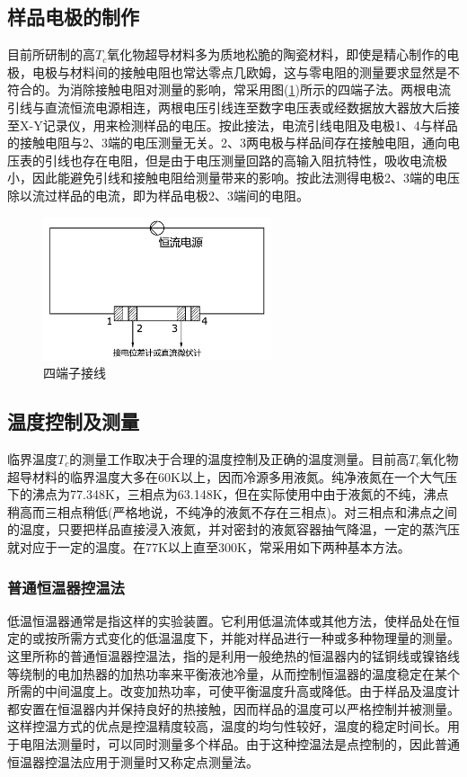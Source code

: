 \documentclass[a4paper]{article}
\begin{document}
\subsection{样品电极的制作}
目前所研制的高$T_c$氧化物超导材料多为质地松脆的陶瓷材料，即使是精心制作的电极，电极与材料间的接触电阻也常达零点几欧姆，这与零电阻的测量要求显然是不符合的。为消除接触电阻对测量的影响，常采用图(\ref{fig2})所示的四端子法。两根电流引线与直流恒流电源相连，两根电压引线连至数字电压表或经数据放大器放大后接至X-Y记录仪，用来检测样品的电压。按此接法，电流引线电阻及电极1、4与样品的接触电阻与2、3端的电压测量无关。2、3两电极与样品间存在接触电阻，通向电压表的引线也存在电阻，但是由于电压测量回路的高输入阻抗特性，吸收电流极小，因此能避免引线和接触电阻给测量带来的影响。按此法测得电极2、3端的电压除以流过样品的电流，即为样品电极2、3端间的电阻。
\begin{figure}[!h]
\centering
\includegraphics[width=0.6\textwidth]{fig/fig2.pdf}
\caption{四端子接线}\label{fig2}
\end{figure}

\subsection{温度控制及测量}
临界温度$T_c$的测量工作取决于合理的温度控制及正确的温度测量。目前高$T_c$氧化物超导材料的临界温度大多在60K以上，因而冷源多用液氮。纯净液氮在一个大气压下的沸点为77.348K，三相点为63.148K，但在实际使用中由于液氮的不纯，沸点稍高而三相点稍低(严格地说，不纯净的液氮不存在三相点)。对三相点和沸点之间的温度，只要把样品直接浸入液氮，并对密封的液氮容器抽气降温，一定的蒸汽压就对应于一定的温度。在77K以上直至300K，常采用如下两种基本方法。
\subsubsection{普通恒温器控温法}
低温恒温器通常是指这样的实验装置。它利用低温流体或其他方法，使样品处在恒定的或按所需方式变化的低温温度下，并能对样品进行一种或多种物理量的测量。这里所称的普通恒温器控温法，指的是利用一般绝热的恒温器内的锰铜线或镍铬线等绕制的电加热器的加热功率来平衡液池冷量，从而控制恒温器的温度稳定在某个所需的中间温度上。改变加热功率，可使平衡温度升高或降低。由于样品及温度计都安置在恒温器内并保持良好的热接触，因而样品的温度可以严格控制并被测量。这样控温方式的优点是控温精度较高，温度的均匀性较好，温度的稳定时间长。用于电阻法测量时，可以同时测量多个样品。由于这种控温法是点控制的，因此普通恒温器控温法应用于测量时又称定点测量法。
\end{document}
